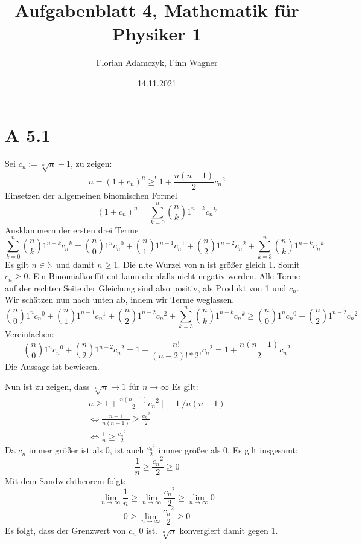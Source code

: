\documentclass{article}
\date{14.11.2021}
\title{Aufgabenblatt 4, Mathematik für Physiker 1}
\author{Florian Adamczyk, Finn Wagner}
\begin{document}
    \maketitle

    \section*{A 5.1}
    
    Sei \(c_n := \sqrt[n]{n} - 1\), zu zeigen:
    \[ n = {(1+c_n)}^n \geq^! 1 + \frac{n (n-1)}{2} {c_n}^2 \]
    Einsetzen der allgemeinen binomischen Formel
    \[ {(1+c_n)}^n = \sum_{k=0}^{n} \binom{n}{k} 1^{n-k} {c_n}^k \]
    Ausklammern der ersten drei Terme
    \[ \sum_{k=0}^{n} \binom{n}{k} 1^{n-k} {c_n}^k = \binom{n}{0} 1^n {c_n}^0 + \binom{n}{1} 1^{n-1} {c_n}^1 + \binom{n}{2} 1^{n-2} {c_n}^2 + \sum_{k=3}^{n} \binom{n}{k} 1^{n-k} {c_n}^k \]
    Es gilt \(n \in \mathbb{N}\) und damit \(n \geq 1\). Die n.te Wurzel von n ist größer gleich 1. Somit \(c_n \geq 0\).
    Ein Binomialkoeffitient kann ebenfalls nicht negativ werden. Alle Terme auf der rechten Seite der Gleichung sind also positiv, als Produkt von 1 und \(c_n\).
    Wir schätzen nun nach unten ab, indem wir Terme weglassen.
    \[ \binom{n}{0} 1^n {c_n}^0 + \binom{n}{1} 1^{n-1} {c_n}^1 + \binom{n}{2} 1^{n-2} {c_n}^2 + \sum_{k=3}^{n} \binom{n}{k} 1^{n-k} {c_n}^k \geq \binom{n}{0} 1^n {c_n}^0 + \binom{n}{2} 1^{n-2} {c_n}^2 \]
    Vereinfachen:
    \[ \binom{n}{0} 1^n {c_n}^0 + \binom{n}{2} 1^{n-2} {c_n}^2 = 1 + \frac{n!}{(n-2)! * 2!} {c_n}^2 = 1 + \frac{n (n-1)}{2} {c_n}^2 \]
    Die Aussage ist bewiesen.

    Nun ist zu zeigen, dass \(\sqrt[n]{n} \to 1\) für \(n \to \infty\)
    Es gilt: 
    \begin{gather*}
        n \geq 1 + \frac{n (n-1)}{2} {c_n}^2 \ | \ -1 \ / n(n-1) \\
        \Leftrightarrow \frac{n-1}{n(n-1)} \geq \frac{{c_n}^2}{2} \\
        \Leftrightarrow \frac{1}{n} \geq \frac{{c_n}^2}{2}
    \end{gather*}
    Da \(c_n\) immer größer ist als 0, ist auch \(\frac{{c_n}^2}{2}\) immer größer als 0. Es gilt insgesamt:
    \[ \frac{1}{n} \geq \frac{{c_n}^2}{2} \geq 0 \]
    Mit dem Sandwichtheorem folgt:
    \[ \lim_{n \to \infty} \frac{1}{n} \geq \lim_{n \to \infty} \frac{{c_n}^2}{2} \geq \lim_{n \to \infty} 0 \]
    \[ 0 \geq \lim_{n \to \infty} \frac{{c_n}^2}{2} \geq 0 \]
    Es folgt, dass der Grenzwert von \(c_n\) 0 ist. \(\sqrt[n]{n}\) konvergiert damit gegen 1.
\end{document}
